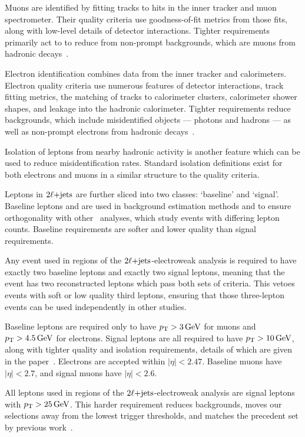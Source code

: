 Muons are identified by fitting tracks to hits in the inner tracker and muon
spectrometer.
Their quality criteria use goodness-of-fit metrics from those fits, along with
low-level details of detector interactions.
Tighter requirements primarily act to to reduce from non-prompt backgrounds,
which are muons from hadronic decays~\cite{atlas_muon_quality_MUON_2018_03}.

Electron identification combines data from the inner tracker and
calorimeters.
Electron quality criteria use numerous features of detector
interactions, track fitting metrics, the matching of tracks to calorimeter
clusters, calorimeter shower shapes, and leakage into the hadronic calorimeter.
Tighter requirements reduce backgrounds, which include misidentified objects
--- photons and hadrons --- as well as non-prompt electrons from hadronic
decays~\cite{atlas_egamma_quality_EGAM_2018_01}.

Isolation of leptons from nearby hadronic activity is another feature which
can be used to reduce misidentification rates.
Standard isolation definitions exist for both electrons and muons in a similar
structure to the quality criteria.

Leptons in $\twoljets$ are further sliced into two classes:
`baseline' and `signal'.
Baseline leptons and are used in background estimation methods and to ensure
orthogonality with other \atlas\ analyses, which study events with differing
lepton counts.
Baseline requirements are softer and lower quality than signal requirements.

Any event used in regions of the $\twoljets$-electroweak analysis is required
to have exactly two baseline leptons and exactly two signal leptons, meaning
that the event has two reconstructed leptons which pass both sets of criteria.
This vetoes events with soft or low quality third leptons, ensuring that those
three-lepton events can be used independently in other studies.

Baseline leptons are required only to have  $\pt > 3\,\eV[G]$ for muons and
$\pt > 4.5\,\eV[G]$ for electrons.
Signal leptons are all required to have $\pt > 10\,\eV[G]$, along with tighter
quality and isolation requirements, details of which are given in the
paper~\cite{atlas2022searches}.
Electrons are accepted within $|\eta| < 2.47$.
Baseline muons have $|\eta| < 2.7$, and signal muons have $|\eta| < 2.6$.


All leptons used in regions of the $\twoljets$-electroweak analysis are signal
leptons with $\pt > 25\,\eV[G]$.
This harder requirement reduces backgrounds, moves our selections away from the
lowest trigger thresholds, and matches the precedent set by previous
work~\cite{atlas_23l_SUSY_2016_24}.


